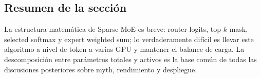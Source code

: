 
\subsection{Resumen de la sección}

La estructura matemática de Sparse MoE es breve: router logits, top-$k$ mask, selected softmax y expert weighted sum; lo verdaderamente difícil es llevar este algoritmo a nivel de token a varias GPU y mantener el balance de carga. La descomposición entre parámetros totales y activos es la base común de todas las discusiones posteriores sobre myth, rendimiento y despliegue.
